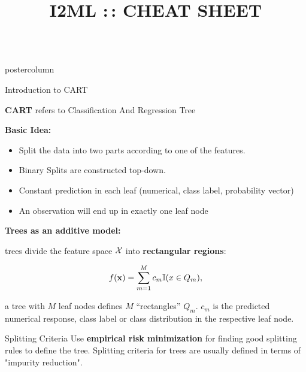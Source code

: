 \documentclass{beamer}
\title{I2ML :\,: CHEAT SHEET} %
\begin{document}
\begin{frame}[fragile]{}
\begin{columns}
	\begin{column}{.31\textwidth}
		\begin{beamercolorbox}[center]{postercolumn}
			\begin{minipage}{.98\textwidth}
				\parbox[t][\columnheight]{\textwidth}{
					\begin{myblock}{Introduction to CART}
						\begin{codebox}
							\textbf{CART} refers to Classification And Regression Tree
						\end{codebox}

						\begin{codebox}
							\textbf{Basic Idea:}
						\end{codebox}
						\begin{itemize}[$\bullet$]     
            \setlength{\itemindent}{+.3in}
                        \item Split the data into two parts according to one of the features.
                        \item Binary Splits are constructed top-down.
                        \item Constant prediction in each leaf (numerical, class label, probability vector)
                        \item An observation will end up in exactly one leaf node
                        \end{itemize}
				
						\begin{codebox}
						\textbf{Trees as an additive model: }
						\end{codebox}
						
trees divide the feature space $\mathcal{X}$ into \textbf{rectangular regions}:

\begin{align*}
f(\mathbf{x}) = \sum_{m=1}^M c_m \mathbb{I}(x \in Q_m),
\end{align*}

a tree with $M$ leaf nodes defines $M$ \enquote{rectangles} $Q_m$.\vspace*{1ex}
$c_m$ is the predicted numerical response, class label or class distribution in the respective leaf node.
\end{myblock}

\begin{myblock}{Splitting Criteria}
Use \textbf{empirical risk minimization} for finding good splitting rules to define the tree. Splitting criteria for trees are usually defined in terms of "impurity reduction".


\end{myblock}}
\end{minipage}
\end{beamercolorbox}
\end{column}
\end{columns}
\end{frame}
\end{document}
